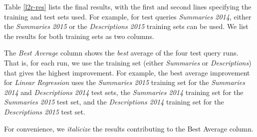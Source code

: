 Table \ref{l2r-res} lists the final results, with the first and second lines
specifying the training and test sets used. For example, for test queries \emph{Summaries 2014},
either the \emph{Summaries 2015} or the \emph{Descriptions 2015} training sets can be used.
We list the results for both training sets as two columns.

The \emph{Best Average} column shows the \emph{best} average of the four test query runs.
That is, for each run, we use the training set (either \emph{Summaries} or \emph{Descriptions}) that gives the highest
improvement. For example, the best average improvement for \emph{Linear Regression} uses the \emph{Summaries 2015} training set for the
\emph{Summaries 2014} and \emph{Descriptions 2014} test sets,
the \emph{Summaries 2014} training set for the \emph{Summaries 2015} test set, and
the \emph{Descriptions 2014} training set for the \emph{Descriptions 2015} test set.

For convenience, we \textit{italicize} the results contributing to the Best Average column.

